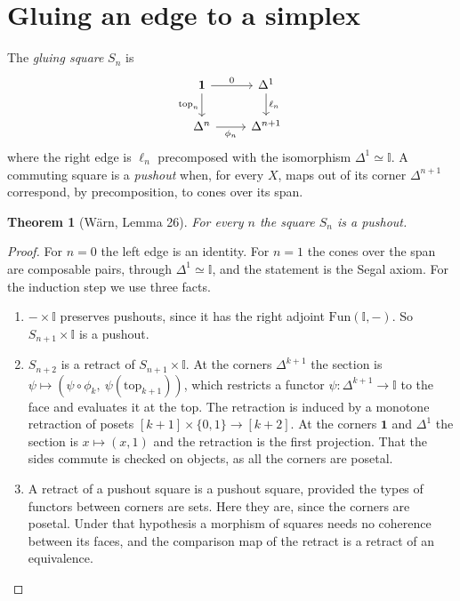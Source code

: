 \documentclass[11pt]{amsart}
\numberwithin{equation}{section}
\newtheorem{theorem}{Theorem}[section]
\theoremstyle{definition}
\theoremstyle{remark}
\newcommand{\Fun}{\mathrm{Fun}}
\newcommand{\II}{\mathbb{I}}
\newcommand{\one}{\mathbf{1}}
\begin{document}
\section{Gluing an edge to a simplex}\label{sec:lemma26}

The \emph{gluing square} $S_n$ is
\[
\begin{tikzcd}
\one \arrow[r,"0"] \arrow[d,"\mathrm{top}_n"'] & \Delta^1 \arrow[d,"\ell_n"]\\
\Delta^n \arrow[r,"\phi_n"'] & \Delta^{n+1}
\end{tikzcd}
\]
where the right edge is $\ell_n$ precomposed with the isomorphism
$\Delta^1\simeq\II$. A commuting square is a \emph{pushout} when, for
every $X$, maps out of its corner $\Delta^{n+1}$ correspond, by
precomposition, to cones over its span.

\begin{theorem}[W\"arn, Lemma 26]\label{thm:lemma26}
For every $n$ the square $S_n$ is a pushout.
\end{theorem}

\begin{proof}
For $n=0$ the left edge is an identity. For $n=1$ the cones over the
span are composable pairs, through $\Delta^1\simeq\II$, and the
statement is the Segal axiom. For the induction step we use three
facts.
\begin{enumerate}
\item $-\times\II$ preserves pushouts, since it has the right adjoint
  $\Fun(\II,-)$. So $S_{n+1}\times\II$ is a pushout.
\item $S_{n+2}$ is a retract of $S_{n+1}\times\II$. At the corners
  $\Delta^{k+1}$ the section is $\psi\mapsto(\psi\circ\phi_k,\
  \psi(\mathrm{top}_{k+1}))$, which restricts a functor
  $\psi:\Delta^{k+1}\to\II$ to the face and evaluates it at the top. The
  retraction is induced by a monotone retraction of posets
  $[k+1]\times\{0,1\}\to[k+2]$. At the corners $\one$ and $\Delta^1$
  the section is $x\mapsto(x,1)$ and the retraction is the first
  projection. That the sides commute is checked on objects, as all the
  corners are posetal.
\item A retract of a pushout square is a pushout square, provided the
  types of functors between corners are sets. Here they are, since the
  corners are posetal. Under that hypothesis a morphism of squares
  needs no coherence between its faces, and the comparison map of the
  retract is a retract of an equivalence. \qedhere
\end{enumerate}
\end{proof}
\end{document}

